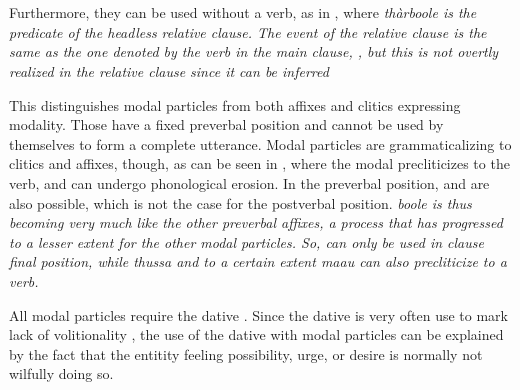 \\


\\


 Furthermore, they can be used without a verb, as in , where \em thàrboole \em is  the predicate of the headless relative clause. The event of the relative clause is the same as the one denoted by the verb in the main clause, , but this is not overtly realized in the relative clause since it can be inferred



This distinguishes modal particles from both affixes and clitics expressing modality. Those have a fixed preverbal position and cannot be used by themselves to form a complete utterance. Modal particles are grammaticalizing to clitics and affixes, though, as can be seen in  , where the modal precliticizes to the verb, and can undergo phonological erosion. In the preverbal position,  and  are also possible, which is not the case for the postverbal position. \em boole \em is thus becoming very much like the other preverbal affixes, a process that has progressed to a lesser extent for the other modal particles.  So,     can only be used in clause final position, while \em thussa \em and to a certain extent \em maau \em can also precliticize to a verb.

All modal particles require the dative  \citep[cf][]{Slomanson2008lingua}. Since the dative is very often use to mark lack of volitionality \citep{Ansaldo2005ms}, the use of the dative with modal particles can be explained by the fact that the entitity feeling possibility, urge, or desire is normally not wilfully doing so.

